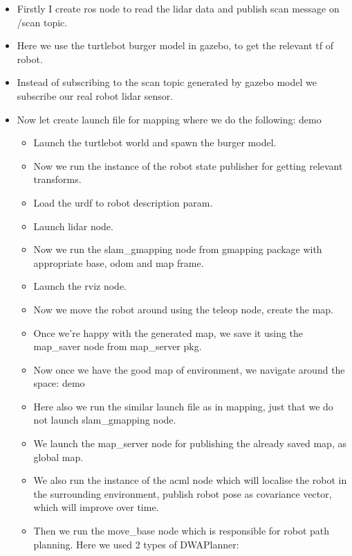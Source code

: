 \begin{itemize}
    \item Firstly I create ros node to read the lidar data and publish scan message on /scan topic.
    \item Here we use the turtlebot burger model in gazebo, to get the relevant tf of robot.
    \item Instead of subscribing to the scan topic generated by gazebo model we subscribe our real robot lidar sensor.
    \item Now let create launch file for mapping where we do the following:            demo
    \begin{itemize}
        \item Launch the turtlebot world and spawn the burger model.
        \item Now we run the instance of the robot state publisher for getting relevant transforms.
        \item Load the urdf to robot description param.
        \item Launch lidar node.
        \item Now we run the slam\_gmapping node from gmapping package with appropriate base, odom and map frame.
        \item Launch the rviz node.
        \item Now we move the robot around using the teleop node, create the map.
        \item Once we’re happy with the generated map, we save it using the map\_saver node from map\_server pkg.
    \end{itemize}
    \begin{itemize}
    \item Now once we have the good map of environment, we navigate around the space: demo
        \item Here also we run the similar launch file as in mapping, just that we do not launch slam\_gmapping node.
        \item We launch the map\_server node for publishing the already saved map, as global map.
        \item We also run the instance of the acml node which will localise the robot in the surrounding environment, publish robot pose as covariance vector, which will improve over time.
        \item Then we run the move\_base node which is responsible for robot path planning. Here we used 2 types of DWAPlanner:
        \begin{itemize}

\end{itemize}
\end{itemize}
\end{itemize}
